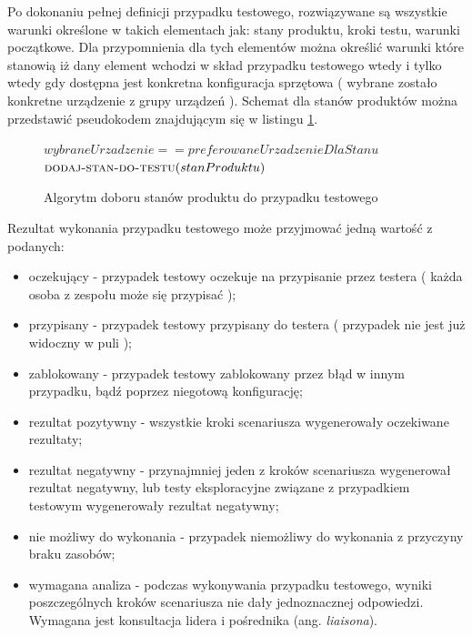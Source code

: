 Po dokonaniu pełnej definicji przypadku testowego, rozwiązywane są wszystkie warunki określone w takich elementach jak: stany produktu, kroki testu, warunki początkowe. Dla przypomnienia dla tych elementów można określić warunki które stanowią iż dany element wchodzi w skład przypadku testowego wtedy i tylko wtedy gdy dostępna jest konkretna konfiguracja sprzętowa ( wybrane zostało konkretne urządzenie z grupy urządzeń ). Schemat dla stanów produktów można przedstawić pseudokodem znajdującym się w listingu \ref{lst:doborWarunkow}.
\begin{figure}[h]
	\begin{codebox}
	\li {}
	\li \Do   
	\li \Do
	     \If $wybraneUrzadzenie  ==  preferowaneUrzadzenieDlaStanu$
	\li     \Then
	           $\textnormal{\scshape dodaj-stan-do-testu}(stanProduktu)$	         	         
	        \End	        
	\li  \End	 
	\li
	  \End
	  
	\end{codebox}
	\caption{ Algorytm doboru stanów produktu do przypadku testowego }
	\label{lst:doborWarunkow}
\end{figure}
\newpage

Rezultat wykonania przypadku testowego może przyjmować jedną wartość z podanych:
\begin{itemize}
   \item oczekujący - przypadek testowy oczekuje na przypisanie przez testera ( każda osoba z zespołu może się przypisać );
   \item przypisany - przypadek testowy przypisany do testera ( przypadek nie jest już widoczny w puli );
   \item zablokowany - przypadek testowy zablokowany przez błąd w innym przypadku, bądź poprzez niegotową konfigurację;
   \item rezultat pozytywny - wszystkie kroki scenariusza wygenerowały oczekiwane rezultaty;
   \item rezultat negatywny - przynajmniej jeden z kroków scenariusza wygenerował rezultat negatywny, lub testy eksploracyjne związane z przypadkiem testowym wygenerowały rezultat negatywny;
   \item nie możliwy do wykonania - przypadek niemożliwy do wykonania z przyczyny braku zasobów;
   \item wymagana analiza - podczas wykonywania przypadku testowego, wyniki poszczególnych kroków scenariusza nie dały jednoznacznej odpowiedzi. Wymagana jest konsultacja lidera i pośrednika (ang. \textit{liaisona}).
 \end{itemize} 

